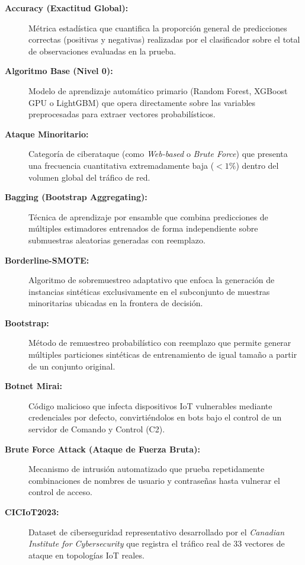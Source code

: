 \begin{description}
    \item[\textbf{Accuracy (Exactitud Global):}] Métrica estadística que cuantifica la proporción general de predicciones correctas (positivas y negativas) realizadas por el clasificador sobre el total de observaciones evaluadas en la prueba.

    \item[\textbf{Algoritmo Base (Nivel 0):}] Modelo de aprendizaje automático primario (Random Forest, XGBoost GPU o LightGBM) que opera directamente sobre las variables preprocesadas para extraer vectores probabilísticos.

    \item[\textbf{Ataque Minoritario:}] Categoría de ciberataque (como \textit{Web-based} o \textit{Brute Force}) que presenta una frecuencia cuantitativa extremadamente baja ($<1\%$) dentro del volumen global del tráfico de red.

    \item[\textbf{Bagging (Bootstrap Aggregating):}] Técnica de aprendizaje por ensamble que combina predicciones de múltiples estimadores entrenados de forma independiente sobre submuestras aleatorias generadas con reemplazo.

    \item[\textbf{Borderline-SMOTE:}] Algoritmo de sobremuestreo adaptativo que enfoca la generación de instancias sintéticas exclusivamente en el subconjunto de muestras minoritarias ubicadas en la frontera de decisión.

    \item[\textbf{Bootstrap:}] Método de remuestreo probabilístico con reemplazo que permite generar múltiples particiones sintéticas de entrenamiento de igual tamaño a partir de un conjunto original.

    \item[\textbf{Botnet Mirai:}] Código malicioso que infecta dispositivos IoT vulnerables mediante credenciales por defecto, convirtiéndolos en bots bajo el control de un servidor de Comando y Control (C2).

    \item[\textbf{Brute Force Attack (Ataque de Fuerza Bruta):}] Mecanismo de intrusión automatizado que prueba repetidamente combinaciones de nombres de usuario y contraseñas hasta vulnerar el control de acceso.

    \item[\textbf{CICIoT2023:}] Dataset de ciberseguridad representativo desarrollado por el \textit{Canadian Institute for Cybersecurity} que registra el tráfico real de 33 vectores de ataque en topologías IoT reales.


\end{description}
